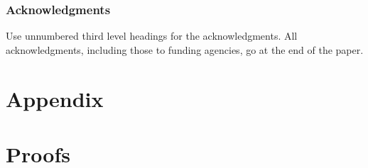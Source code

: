 \documentclass{article} %
\theoremstyle{plain}
\theoremstyle{definition}
\theoremstyle{remark}
\begin{document}
\subsubsection*{Acknowledgments}
Use unnumbered third level headings for the acknowledgments. All
acknowledgments, including those to funding agencies, go at the end of the paper.





\appendix
\section{Appendix}

\section{Proofs}
\end{document}
